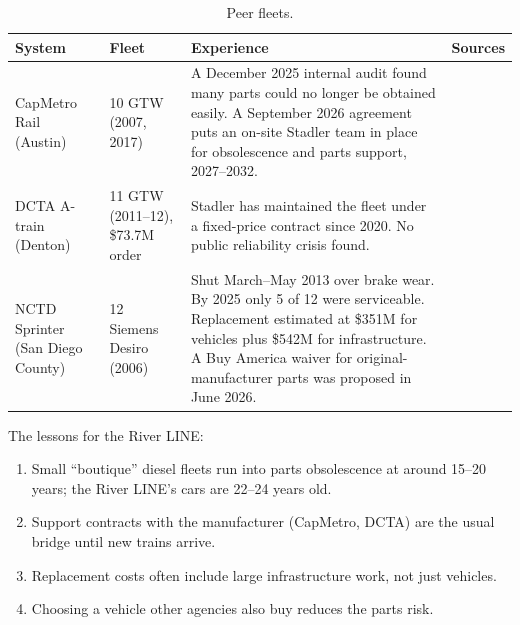 \documentclass[11pt]{article}
\begin{document}
\begin{table}[ht]\centering\small
\begin{tabularx}{\textwidth}{@{}p{2.6cm}p{2.5cm}L p{2.4cm}@{}}
\toprule
System & Fleet & Experience & Sources \\
\midrule
CapMetro Rail (Austin) & 10 GTW (2007, 2017) & A December 2025 internal audit found many parts could no longer be obtained easily. A September 2026 agreement puts an on-site Stadler team in place for obsolescence and parts support, 2027--2032. & \citep{capmetro2026stadler,railwaysupply2026,capmetro_wiki} \\
DCTA A-train (Denton) & 11 GTW (2011--12), \$73.7M order & Stadler has maintained the fleet under a fixed-price contract since 2020. No public reliability crisis found. & \citep{dcta2009,dcta2020} \\
NCTD Sprinter (San Diego County) & 12 Siemens Desiro (2006) & Shut March--May 2013 over brake wear. By 2025 only 5 of 12 were serviceable. Replacement estimated at \$351M for vehicles plus \$542M for infrastructure. A Buy America waiver for original-manufacturer parts was proposed in June 2026. & \citep{trains2025sprinter,fr2026nctd} \\
\bottomrule
\end{tabularx}
\caption{Peer fleets.}
\end{table}

The lessons for the River LINE:
\begin{enumerate}
\item Small ``boutique'' diesel fleets run into parts obsolescence at around 15--20 years; the River LINE's cars are 22--24 years old.
\item Support contracts with the manufacturer (CapMetro, DCTA) are the usual bridge until new trains arrive.
\item Replacement costs often include large infrastructure work, not just vehicles.
\item Choosing a vehicle other agencies also buy reduces the parts risk.
\end{enumerate}

\end{document}
